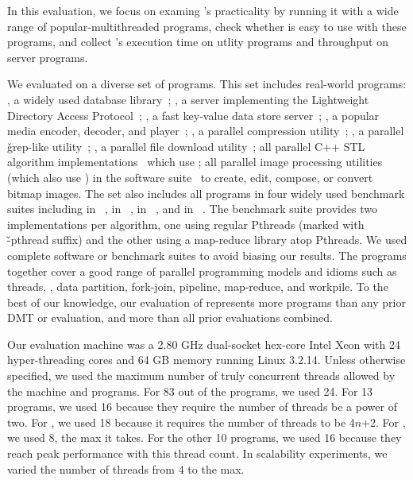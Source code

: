 In this evaluation, we focus on examing \parrot's practicality by running it 
with a wide range of popular-multithreaded programs, check whether \parrot is 
easy to use with these programs, and collect \parrot's 
execution time on utlity programs and throughput on server programs.

We evaluated \parrot on a diverse set of \nprog programs. This set
includes \nrealprog real-world programs: \bdb, a widely used database
library~\cite{berkeleydb}; \openldap, a server implementing the
Lightweight Directory Access Protocol~\cite{openldap}; \redis, a fast
key-value data store server~\cite{redis}; \mplayer, a popular media
encoder, decoder, and player~\cite{mplayer}; \pbzip, a parallel
compression utility~\cite{pbzip2}; \pfscan, a parallel \v{grep}-like
utility~\cite{pfscan}; \aget, a parallel file download
utility~\cite{aget}; all \nstl parallel C++ STL algorithm
implementations~\cite{parallel-stl} which use \openmp; all \nimagick
parallel image processing utilities (which also use \openmp) in the
\imagick software suite~\cite{imagick} to create, edit, compose, or
convert bitmap images.  The set also includes all \nbenchmarks programs in
four widely used benchmark suites including \nparsec in
\parsec~\cite{parsec}, \nphoenix in
\phoenix~\cite{phoenix-benchmarks}, \nsplash in
\splashx~\cite{splashx}, and \nnpb in \npb~\cite{npb}.  The \phoenix
benchmark suite provides two implementations per algorithm, one using
regular Pthreads (marked with \v{-pthread} suffix) and the other using
a map-reduce library atop Pthreads.  We used complete software or
benchmark suites to avoid biasing our results.  The programs together
cover a good range of parallel programming models and idioms such as
threads, \openmp, data partition, fork-join, pipeline, map-reduce, and
workpile.  To the best of our knowledge, our evaluation of \parrot
represents \overeach more programs than any prior DMT or \smt
evaluation, and \overcombined more than all prior
evaluations combined.

Our evaluation machine was a 2.80 GHz dual-socket hex-core Intel Xeon
with 24 hyper-threading cores and 64 GB memory
running Linux 3.2.14.  Unless otherwise specified, we used the maximum
number of truly concurrent threads allowed by the machine and programs.  For 83
out of the \nprog programs, we used 24.  For 13 programs, we used 16
because they require the number of threads be a power of 
two. For \ferret, we used 18 because it requires
the number of threads to be 4$n$+2. For \mplayer, we used 8,
the max it takes. For the other
10 programs, we used 16 because they reach peak performance with
this thread count.  In scalability experiments, we varied the number of
threads from 4 to the max.



